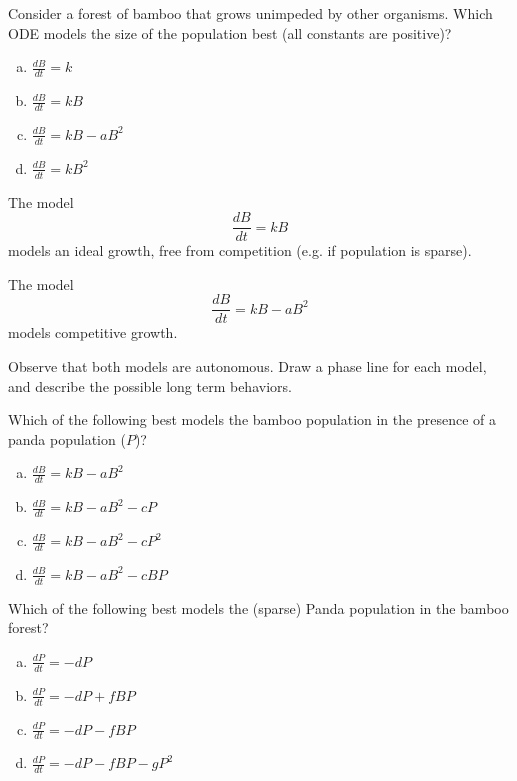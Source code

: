\begin{applicationActivities}

\begin{activity}{5}
Consider a forest of bamboo that grows unimpeded by other organisms.  Which ODE models the size of the population best (all constants are positive)?
\vfill
\begin{enumerate}[(a)]
\item \(\frac{dB}{dt} = k\)
\item \(\frac{dB}{dt} = kB\)
\item \(\frac{dB}{dt} = kB-aB^2\)
\item \(\frac{dB}{dt} = kB^2\)
\end{enumerate}
\end{activity}

\begin{activity}{5}
The model \[\frac{dB}{dt}=kB\] models an ideal growth, free from competition (e.g. if population is sparse).

\vfill
The model \[ \frac{dB}{dt}=kB-aB^2\] models competitive growth.

\vfill
Observe that both models are autonomous.  Draw a phase line for each model, and describe the possible long term behaviors.
\end{activity}

\begin{activity}{10}
Which of the following best models the bamboo population in the presence of a panda population (\(P\))?
\vfill
\begin{enumerate}[(a)]
\item \(\frac{dB}{dt} = kB-aB^2\)
\item \(\frac{dB}{dt} = kB-aB^2-cP\)
\item \(\frac{dB}{dt} = kB-aB^2-cP^2\)
\item \(\frac{dB}{dt} = kB-aB^2-cBP\)
\end{enumerate}
\end{activity}

\begin{activity}{5}
Which of the following best models the (sparse) Panda population in the bamboo forest?
\vfill
\begin{enumerate}[(a)]
\item \(\frac{dP}{dt} = -dP \)
\item \(\frac{dP}{dt} = -dP+fBP \)
\item \(\frac{dP}{dt} = -dP-fBP \)
\item \(\frac{dP}{dt} = -dP-fBP-gP^2 \)
\end{enumerate}
\end{activity}


\end{applicationActivities}
